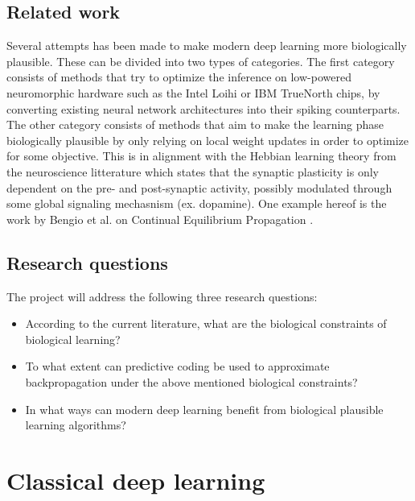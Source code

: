 \documentclass[a4paper,11pt]{article} %
\begin{document}
\subsection{Related work}

Several attempts has been made to make modern deep learning more biologically plausible. These can be divided into two types of categories. The first category consists of methods that try to optimize the inference on low-powered neuromorphic hardware such as the Intel Loihi or IBM TrueNorth chips, by converting existing neural network architectures into their spiking counterparts. The other category consists of methods that aim to make the learning phase biologically plausible by only relying on local weight updates in order to optimize for some objective. This is in alignment with the Hebbian learning theory from the neuroscience litterature which states that the synaptic plasticity is only dependent on the pre- and post-synaptic activity, possibly modulated through some global signaling mechasnism (ex. dopamine). One example hereof is the work by Bengio et al. on Continual Equilibrium Propagation \cite{EqProp}. 

\subsection{Research questions}
The project will address the following three research questions:
\begin{itemize}
  \item According to the current literature, what are the biological constraints of biological learning?
  \item To what extent can predictive coding be used to approximate backpropagation under the above mentioned biological constraints?
  \item In what ways can modern deep learning benefit from biological plausible learning algorithms?
\end{itemize}

\section{Classical deep learning}
\end{document}
